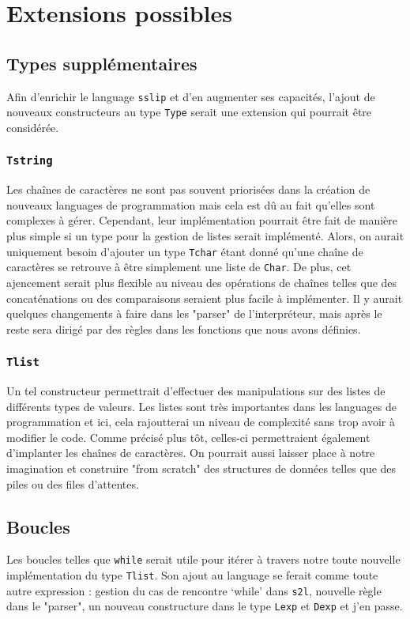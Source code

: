 \documentclass[a4paper,12pt]{article}
\begin{document}
\section{Extensions possibles}
    \subsection{Types supplémentaires}
        Afin d'enrichir le language \texttt{sslip} et d'en augmenter ses capacités, l'ajout de 
        nouveaux constructeurs au type \texttt{Type} serait une extension qui pourrait être 
        considérée.
        \subsubsection{\texttt{Tstring}}
            Les chaînes de caractères ne sont pas souvent priorisées dans la création de nouveaux
            languages de programmation mais cela est dû au fait qu'elles sont complexes à gérer.
            Cependant, leur implémentation pourrait être fait de manière plus simple si un type
            pour la gestion de listes serait implémenté. Alors, on aurait uniquement besoin 
            d'ajouter un type \texttt{Tchar} étant donné qu'une chaîne de caractères se retrouve
            à être simplement une liste de \texttt{Char}. De plus, cet ajencement serait plus
            flexible au niveau des opérations de chaînes telles que des concaténations ou des 
            comparaisons seraient plus facile à implémenter. Il y aurait quelques changements 
            à faire dans les "parser" de l'interpréteur, mais après le reste sera dirigé par 
            des règles dans les fonctions que nous avons définies.
        \subsubsection{\texttt{Tlist}}
            Un tel constructeur permettrait d'effectuer des manipulations sur des listes
            de différents types de valeurs. Les listes sont très importantes dans les 
            languages de programmation et ici, cela rajoutterai un niveau de complexité 
            sans trop avoir à modifier le code. Comme précisé plus tôt, celles-ci permettraient
            également d'implanter les chaînes de caractères. On pourrait aussi laisser
            place à notre imagination et construire "from scratch" des structures de données
            telles que des piles ou des files d'attentes.
    \subsection{Boucles}
        Les boucles telles que \texttt{while} serait utile pour itérer à travers notre toute 
        nouvelle implémentation du type \texttt{Tlist}. Son ajout au language se ferait comme 
        toute autre expression : gestion du cas de rencontre `while' dans \texttt{s2l}, nouvelle
        règle dans le "parser", un nouveau constructure dans le type \texttt{Lexp} et \texttt{Dexp}
        et j'en passe.
\end{document}
